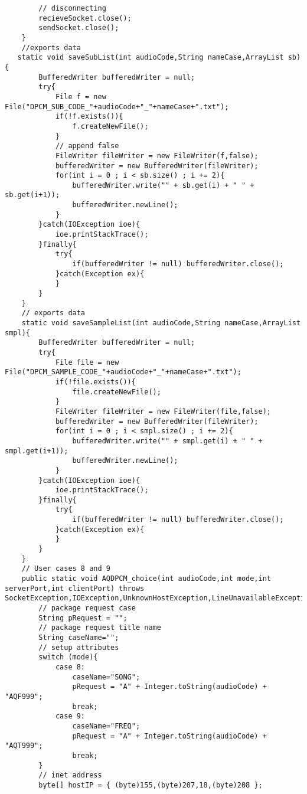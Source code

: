 \documentclass{article}
\begin{document}
\begin{lstlisting}
        // disconnecting
        recieveSocket.close();
        sendSocket.close();
    }
    //exports data
   static void saveSubList(int audioCode,String nameCase,ArrayList sb){
        BufferedWriter bufferedWriter = null;
        try{
            File f = new File("DPCM_SUB_CODE_"+audioCode+"_"+nameCase+".txt");
            if(!f.exists()){
                f.createNewFile();
            }
            // append false
            FileWriter fileWriter = new FileWriter(f,false);
            bufferedWriter = new BufferedWriter(fileWriter);
            for(int i = 0 ; i < sb.size() ; i += 2){
                bufferedWriter.write("" + sb.get(i) + " " + sb.get(i+1));
                bufferedWriter.newLine();
            }
        }catch(IOException ioe){
            ioe.printStackTrace();
        }finally{
            try{
                if(bufferedWriter != null) bufferedWriter.close();
            }catch(Exception ex){
            }
        }
    }
    // exports data
    static void saveSampleList(int audioCode,String nameCase,ArrayList smpl){
        BufferedWriter bufferedWriter = null;
        try{
            File file = new File("DPCM_SAMPLE_CODE_"+audioCode+"_"+nameCase+".txt");
            if(!file.exists()){
                file.createNewFile();
            }
            FileWriter fileWriter = new FileWriter(file,false);
            bufferedWriter = new BufferedWriter(fileWriter);
            for(int i = 0 ; i < smpl.size() ; i += 2){
                bufferedWriter.write("" + smpl.get(i) + " " + smpl.get(i+1));
                bufferedWriter.newLine();
            }
        }catch(IOException ioe){
            ioe.printStackTrace();
        }finally{
            try{
                if(bufferedWriter != null) bufferedWriter.close();
            }catch(Exception ex){
            }
        }
    }
    // User cases 8 and 9
    public static void AQDPCM_choice(int audioCode,int mode,int serverPort,int clientPort) throws SocketException,IOException,UnknownHostException,LineUnavailableException{
        // package request case
        String pRequest = "";
        // package request title name
        String caseName="";
        // setup attributes
        switch (mode){
            case 8:
                caseName="SONG";
                pRequest = "A" + Integer.toString(audioCode) + "AQF999";
                break;
            case 9:
                caseName="FREQ";
                pRequest = "A" + Integer.toString(audioCode) + "AQT999";
                break;
        }
        // inet address
        byte[] hostIP = { (byte)155,(byte)207,18,(byte)208 };

\end{lstlisting}
\end{document}
